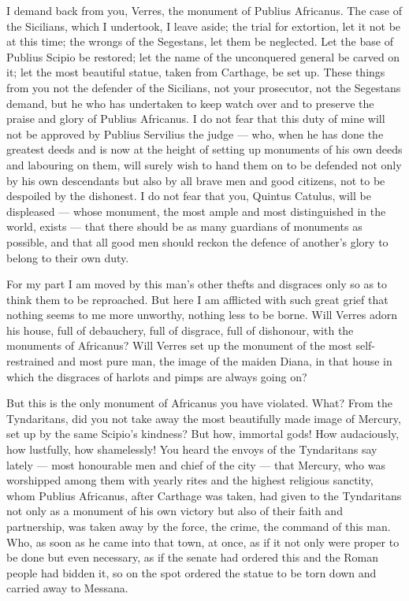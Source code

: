  I demand back from you, Verres, the monument of Publius Africanus. The case of the Sicilians, which I undertook, I leave aside; the trial for extortion, let it not be at this time; the wrongs of the Segestans, let them be neglected. Let the base of Publius Scipio be restored; let the name of the unconquered general be carved on it; let the most beautiful statue, taken from Carthage, be set up. These things from you not the defender of the Sicilians, not your prosecutor, not the Segestans demand, but he who has undertaken to keep watch over and to preserve the praise and glory of Publius Africanus. I do not fear that this duty of mine will not be approved by Publius Servilius the judge --- who, when he has done the greatest deeds and is now at the height of setting up monuments of his own deeds and labouring on them, will surely wish to hand them on to be defended not only by his own descendants but also by all brave men and good citizens, not to be despoiled by the dishonest. I do not fear that you, Quintus Catulus, will be displeased --- whose monument, the most ample and most distinguished in the world, exists --- that there should be as many guardians of monuments as possible, and that all good men should reckon the defence of another's glory to belong to their own duty.

 For my part I am moved by this man's other thefts and disgraces only so as to think them to be reproached. But here I am afflicted with such great grief that nothing seems to me more unworthy, nothing less to be borne. Will Verres adorn his house, full of debauchery, full of disgrace, full of dishonour, with the monuments of Africanus? Will Verres set up the monument of the most self-restrained and most pure man, the image of the maiden Diana, in that house in which the disgraces of harlots and pimps are always going on?

 But this is the only monument of Africanus you have violated. What? From the Tyndaritans, did you not take away the most beautifully made image of Mercury, set up by the same Scipio's kindness? But how, immortal gods! How audaciously, how lustfully, how shamelessly! You heard the envoys of the Tyndaritans say lately --- most honourable men and chief of the city --- that Mercury, who was worshipped among them with yearly rites and the highest religious sanctity, whom Publius Africanus, after Carthage was taken, had given to the Tyndaritans not only as a monument of his own victory but also of their faith and partnership, was taken away by the force, the crime, the command of this man. Who, as soon as he came into that town, at once, as if it not only were proper to be done but even necessary, as if the senate had ordered this and the Roman people had bidden it, so on the spot ordered the statue to be torn down and carried away to Messana.

